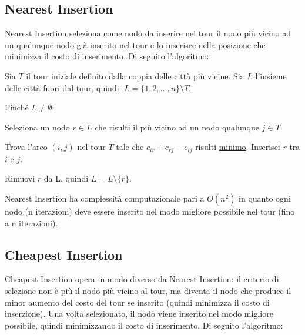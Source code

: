 \documentclass[a4paper,12pt]{report}
\begin{document}
\subsection{Nearest Insertion}
Nearest Insertion seleziona come nodo da inserire nel tour il nodo più vicino ad un qualunque nodo già inserito nel tour e lo inserisce nella posizione che minimizza il costo di inserimento. Di seguito l'algoritmo:

\begin{tcolorbox}[colframe=black,colback=white,boxrule=0.5pt, sharp corners]
\begin{legal}
  \item Sia $T$ il tour iniziale definito dalla coppia delle città più vicine. Sia $L$ l'insieme delle città fuori dal tour, quindi: $L = \{1, 2, ..., n\} \setminus T$.
  \item Finché $L \neq \emptyset$:
  \begin{legal}
    \item Seleziona un nodo $r \in L$ che risulti il più vicino ad un nodo qualunque $j \in T$.
    \item Trova l'arco $(i, j)$ nel tour $T$ tale che $c_{ir} + c_{rj} - c_{ij}$ risulti \underline{minimo}. Inserisci $r$ tra $i$ e $j$.  
    \item Rimuovi $r$ da L, quindi $L = L \setminus \{r\}$.
  \end{legal}
\end{legal}
\end{tcolorbox}
\hfill \break Nearest Insertion ha complessità computazionale pari a $O(n^2)$ in quanto ogni nodo (n iterazioni) deve essere inserito nel modo migliore possibile nel tour (fino a n iterazioni).

\subsection{Cheapest Insertion}
Cheapest Insertion opera in modo diverso da Nearest Insertion: il criterio di selezione non è più il nodo più vicino al tour, ma diventa il nodo che produce il minor aumento del costo del tour se inserito (quindi minimizza il costo di inserzione). Una volta selezionato, il nodo viene inserito nel modo migliore possibile, quindi minimizzando il costo di inserimento. Di seguito l'algoritmo:
\end{document}
